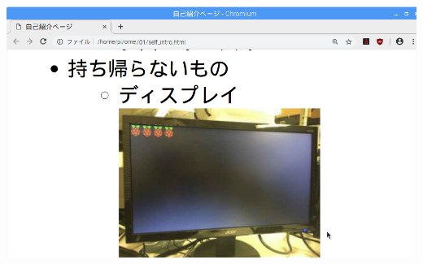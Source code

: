 \documentclass[a4paper,12pt]{jarticle}
\begin{document}
\bigskip

\centering
\includegraphics[width=17.006cm,height=10.44cm]{textbook-img244.png}
\flushleft

\bigskip

\clearpage
\end{document}
